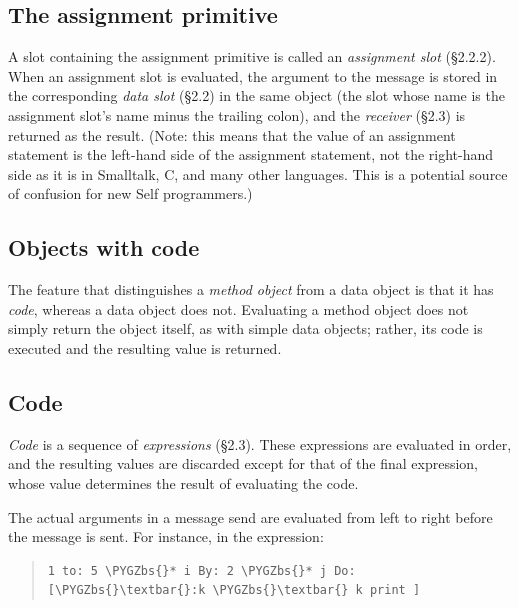 \documentclass[letterpaper,10pt,english]{sphinxmanual}
\def\PYGZbs{\char`\\}
\begin{document}

\subsection{The assignment primitive}
\label{langref:the-assignment-primitive}\label{langref:index-10}
A slot containing the assignment primitive is called an \emph{assignment slot} (\S{}2.2.2). When an assignment
slot is evaluated, the argument to the message is stored in the corresponding \emph{data slot} (\S{}2.2)
in the same object (the slot whose name is the assignment slot’s name minus the trailing colon),
and the \emph{receiver} (\S{}2.3) is returned as the result. (Note: this means that the value of an assignment
statement is the left-hand side of the assignment statement, not the right-hand side as it is in Smalltalk,
C, and many other languages. This is a potential source of confusion for new Self programmers.)


\subsection{Objects with code}
\label{langref:objects-with-code}\label{langref:index-18}
The feature that distinguishes a \emph{method object} from a data object is that it has \emph{code}, whereas a data
object does not. Evaluating a method object does not simply return the object itself, as with simple
data objects; rather, its code is executed and the resulting value is returned.


\subsection{Code}
\label{langref:code}
\emph{Code} is a sequence of \emph{expressions} (\S{}2.3). These expressions are evaluated in order, and the resulting
values are discarded except for that of the final expression, whose value determines the result
of evaluating the code.

The actual arguments in a message send are evaluated from left to right before the message is sent.
For instance, in the expression:
\begin{quote}

\begin{Verbatim}[commandchars=\\\{\}]
1 to: 5 \PYGZbs{}* i By: 2 \PYGZbs{}* j Do: [\PYGZbs{}\textbar{}:k \PYGZbs{}\textbar{} k print ]
\end{Verbatim}
\end{quote}
\end{document}
